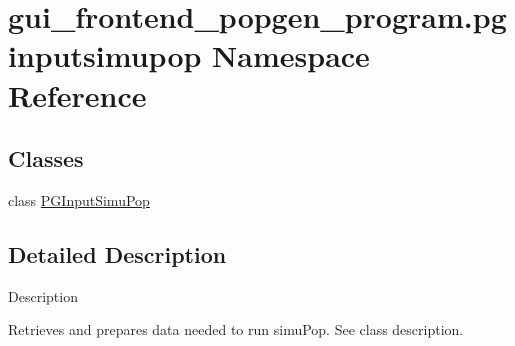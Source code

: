 \hypertarget{namespacegui__frontend__popgen__program_1_1pginputsimupop}{}\section{gui\+\_\+frontend\+\_\+popgen\+\_\+program.\+pginputsimupop Namespace Reference}
\label{namespacegui__frontend__popgen__program_1_1pginputsimupop}
\subsection*{Classes}
\begin{DoxyCompactItemize}
\item 
class \hyperlink{classgui__frontend__popgen__program_1_1pginputsimupop_1_1PGInputSimuPop}{P\+G\+Input\+Simu\+Pop}
\end{DoxyCompactItemize}


\subsection{Detailed Description}
\begin{DoxyVerb}Description

Retrieves and prepares data needed to run simuPop.  See class description.\end{DoxyVerb}
 